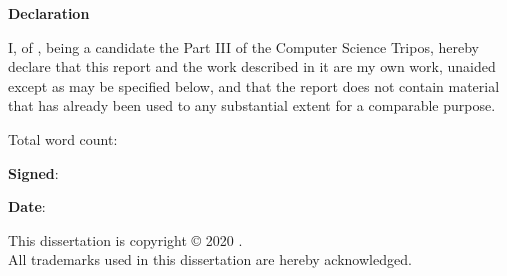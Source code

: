 \newpage
{\Huge \bf Declaration}

\vspace{24pt} 

I, \authorname of \authorcollege, being a candidate the Part III of
the Computer Science Tripos, hereby declare that this report and the
work described in it are my own work, unaided except as may be
specified below, and that the report does not contain material that
has already been used to any substantial extent for a comparable
purpose.

\vspace{24pt}
Total word count: \wordcount

\vspace{60pt}
\textbf{Signed}: 

\vspace{12pt}
\textbf{Date}:


\vfill

This dissertation is copyright \copyright{} 2020 \authorname. 
\\
All trademarks used in this dissertation are hereby acknowledged.



\newpage
\vspace*{\fill}
